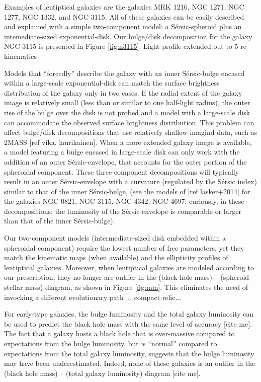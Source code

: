 \documentclass[12pt,preprint]{nature}
\begin{document}
Examples of lentiptical galaxies are the galaxies MRK 1216, NGC 1271, NGC 1277, NGC 1332, and NGC 3115. 
All of these galaxies can be easily described and explained with a simple two-component model: 
a S\'ersic-spheroid plus an intemediate-sized exponential-disk. 
Our bulge/disk decomposition for the galaxy NGC 3115 is presented in Figure \ref{fig:n3115}.
Light profile extended out to 5 re
kinematics



Models that ``forcedly'' describe the galaxy with an inner S\'ersic-bulge 
encased within a large-scale exponential-disk can match the surface brightness distribution 
of the galaxy only in two cases. 
If the radial extent of the galaxy image is relatively small (less than or similar to one half-light radius), 
the outer rise of the bulge over the disk is not probed 
and a model with a large-scale disk can accommodate the observed surface brightness distribution. 
This problem can affect bulge/disk decompositions that use relatively shallow imagind data, 
such as 2MASS [ref vika, laurikainen]. 
When a more extended galaxy image is available, 
a model featuring a bulge encased in large-scale disk can only work with the addition of an outer S\'ersic-envelope, 
that accounts for the outer portion of the spheroidal component. 
These three-component decompositions will typically result in an outer S\'ersic-envelope with a curvature 
(regulated by the S\'ersic index) similar to that of the inner S\'ersic-bulge, 
(see the models of [ref lasker+2014] for the galaxies NGC 0821, NGC 3115, NGC 4342, NGC 4697;
curiously, in these decompositions, the luminosity of the S\'ersic-envelope is comparable or larger than that of the inner S\'ersic-bulge).  

Our two-component models (intermediate-sized disk embedded within a spheroidal component)  
require the lowest number of free parameters, 
yet they match the kinematic maps (when available) and the ellipticity profiles of lentiptical galaxies. 
Moreover, when lentiptical galaxies are modeled according to our prescription, 
they no longer are outlier in the (black hole mass) -- (spheroid stellar mass) diagram, 
as shown in Figure \ref{fig:mm}. 
This eliminates the need of invocking a different evolutionary path ... compact relic...

For early-type galaxies, the bulge luminosity and the total galaxy luminosity can be used to predict the black hole mass 
with the same level of accuracy [cite me].
The fact that a galaxy hosts a black hole that is over-massive compared to expectations from the bulge luminosity, 
but is ``normal'' compared to expectations from the total galaxy luminosity, 
suggests that the bulge luminosity may have been underestimated. 
Indeed, none of these galaxies is an outlier in the (black hole mass) -- (total galaxy luminosity) diagram [cite me]. 
\end{document}
